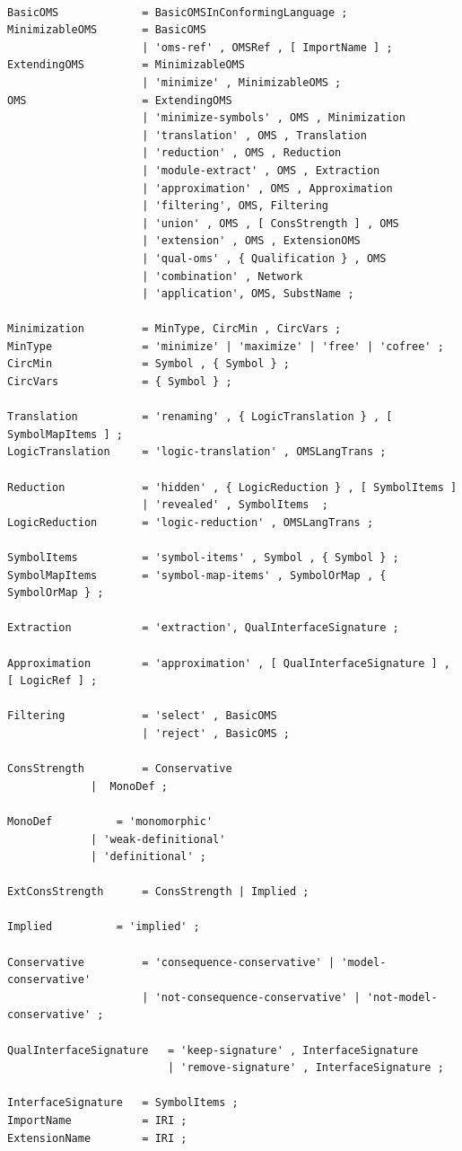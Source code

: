 \documentclass[10pt,fleqn,%
\ifpretendfinal
final%
\else
draft%
\fi,
]{scrreprt}
\begin{document}
\begin{lstlisting}[language=ebnf,escapeinside={<>}]  % abstract syntax

BasicOMS             = BasicOMSInConformingLanguage ;
MinimizableOMS       = BasicOMS
                     | 'oms-ref' , OMSRef , [ ImportName ] ;
ExtendingOMS         = MinimizableOMS
                     | 'minimize' , MinimizableOMS ;
OMS                  = ExtendingOMS
                     | 'minimize-symbols' , OMS , Minimization
                     | 'translation' , OMS , Translation
                     | 'reduction' , OMS , Reduction
                     | 'module-extract' , OMS , Extraction 
                     | 'approximation' , OMS , Approximation
                     | 'filtering', OMS, Filtering
                     | 'union' , OMS , [ ConsStrength ] , OMS 
                     | 'extension' , OMS , ExtensionOMS
                     | 'qual-oms' , { Qualification } , OMS
                     | 'combination' , Network
                     | 'application', OMS, SubstName ;

Minimization         = MinType, CircMin , CircVars ;
MinType              = 'minimize' | 'maximize' | 'free' | 'cofree' ;
CircMin              = Symbol , { Symbol } ;
CircVars             = { Symbol } ;

Translation          = 'renaming' , { LogicTranslation } , [ SymbolMapItems ] ;
LogicTranslation     = 'logic-translation' , OMSLangTrans ;

Reduction            = 'hidden' , { LogicReduction } , [ SymbolItems ]
                     | 'revealed' , SymbolItems  ;
LogicReduction       = 'logic-reduction' , OMSLangTrans ;

SymbolItems          = 'symbol-items' , Symbol , { Symbol } ;
SymbolMapItems       = 'symbol-map-items' , SymbolOrMap , { SymbolOrMap } ;

Extraction           = 'extraction', QualInterfaceSignature ;

Approximation        = 'approximation' , [ QualInterfaceSignature ] , [ LogicRef ] ;

Filtering            = 'select' , BasicOMS 
                     | 'reject' , BasicOMS ;

ConsStrength         = Conservative 
		     |  MonoDef ;

MonoDef 	     = 'monomorphic'  
		     | 'weak-definitional' 
		     | 'definitional' ;

ExtConsStrength      = ConsStrength | Implied ;

Implied 	     = 'implied' ;

Conservative         = 'consequence-conservative' | 'model-conservative' 
                     | 'not-consequence-conservative' | 'not-model-conservative' ;

QualInterfaceSignature   = 'keep-signature' , InterfaceSignature 
                         | 'remove-signature' , InterfaceSignature ;

InterfaceSignature   = SymbolItems ;
ImportName           = IRI ;
ExtensionName        = IRI ;
\end{lstlisting}
\end{document}
